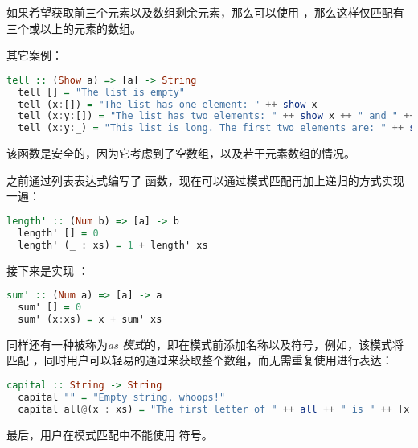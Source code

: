 \documentclass[./main.tex]{subfiles}
\begin{document}
如果希望获取前三个元素以及数组剩余元素，那么可以使用 ，那么这样仅匹配有三个或以上的元素的数组。

其它案例：

\begin{lstlisting}[language=Haskell]
  tell :: (Show a) => [a] -> String
  tell [] = "The list is empty"
  tell (x:[]) = "The list has one element: " ++ show x
  tell (x:y:[]) = "The list has two elements: " ++ show x ++ " and " ++ show y
  tell (x:y:_) = "This list is long. The first two elements are: " ++ show x ++ " and " ++ show y
\end{lstlisting}

该函数是安全的，因为它考虑到了空数组，以及若干元素数组的情况。

之前通过列表表达式编写了  函数，现在可以通过模式匹配再加上递归的方式实现一遍：

\begin{lstlisting}[language=Haskell]
  length' :: (Num b) => [a] -> b
  length' [] = 0
  length' (_ : xs) = 1 + length' xs
\end{lstlisting}

接下来是实现 ：

\begin{lstlisting}[language=Haskell]
  sum' :: (Num a) => [a] -> a
  sum' [] = 0
  sum' (x:xs) = x + sum' xs
\end{lstlisting}

同样还有一种被称为\textit{as 模式}的，即在模式前添加名称以及符号，例如，该模式将匹配
，同时用户可以轻易的通过来获取整个数组，而无需重复使用进行表达：

\begin{lstlisting}[language=Haskell]
  capital :: String -> String
  capital "" = "Empty string, whoops!"
  capital all@(x : xs) = "The first letter of " ++ all ++ " is " ++ [x]
\end{lstlisting}

最后，用户在模式匹配中不能使用 \acode{++} 符号。

\end{document}
